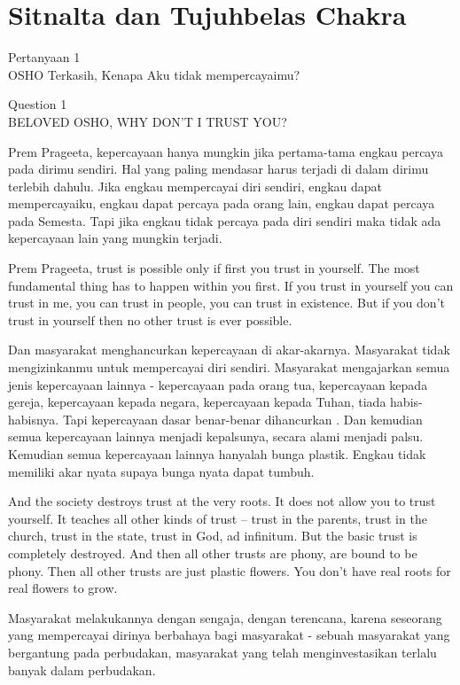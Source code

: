 \chapter{Sitnalta dan Tujuhbelas Chakra}

\bahasa
Pertanyaan 1\\
OSHO Terkasih, Kenapa Aku tidak mempercayaimu?

\english
Question 1\\
BELOVED OSHO, WHY DON'T I TRUST YOU?

\bahasa
Prem Prageeta, kepercayaan hanya mungkin jika pertama-tama engkau percaya pada dirimu sendiri. Hal yang paling mendasar harus terjadi di dalam dirimu terlebih dahulu. Jika engkau mempercayai diri sendiri, engkau dapat mempercayaiku, engkau dapat percaya pada orang lain, engkau dapat percaya pada Semesta. Tapi jika engkau tidak percaya pada diri sendiri maka tidak ada kepercayaan lain yang mungkin terjadi.

\english
Prem Prageeta, trust is possible only if first you trust in yourself. The most fundamental thing has to happen within you first. If you trust in yourself you can trust in me, you can trust in people, you can trust in existence. But if you don't trust in yourself then no other trust is ever possible.

\bahasa
Dan masyarakat menghancurkan kepercayaan di akar-akarnya. Masyarakat tidak mengizinkanmu untuk mempercayai diri sendiri. Masyarakat mengajarkan semua jenis kepercayaan lainnya - kepercayaan pada orang tua, kepercayaan kepada gereja, kepercayaan kepada negara, kepercayaan kepada Tuhan, tiada habis-habisnya. Tapi kepercayaan dasar benar-benar dihancurkan . Dan kemudian semua kepercayaan lainnya menjadi kepalsunya, secara alami menjadi palsu. Kemudian semua kepercayaan lainnya hanyalah bunga plastik. Engkau tidak memiliki akar nyata supaya bunga nyata dapat tumbuh.

\english
And the society destroys trust at the very roots. It does not allow you to trust yourself. It teaches all other kinds of trust -- trust in the parents, trust in the church, trust in the state, trust in God, ad infinitum. But the basic trust is completely destroyed. And then all other trusts are phony, are bound to be phony. Then all other trusts are just plastic flowers. You don't have real roots for real flowers to grow.

\bahasa
Masyarakat melakukannya dengan sengaja, dengan terencana, karena seseorang yang mempercayai dirinya berbahaya bagi masyarakat - sebuah masyarakat yang bergantung pada perbudakan, masyarakat yang telah menginvestasikan terlalu banyak dalam perbudakan.

